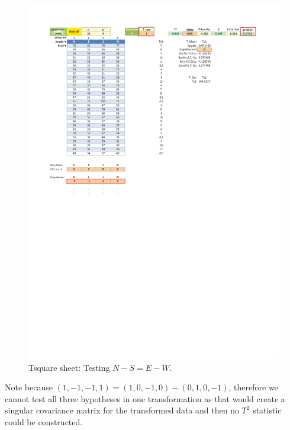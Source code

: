 \documentclass[article]{jss}
\begin{document}
        \begin{figure}[!tbh]
                \includegraphics[width=\linewidth,keepaspectratio=true]{img/TsquareSheetOutput4_markup}
                \vspace{-20pt}\centering\protect\caption{Tsquare sheet: Testing $N-S=E-W$.}\label{fig:TsquareSheetOutput4}
        \end{figure}
        
        
        Note because $(1,-1,-1,1) = (1,0,-1,0) - (0,1,0,-1)$, therefore we cannot test all three hypotheses in one transformation as that would create a singular covariance matrix for the transformed data and then no $T^2$ statistic could be constructed.
        
        
        
        
\end{document}
